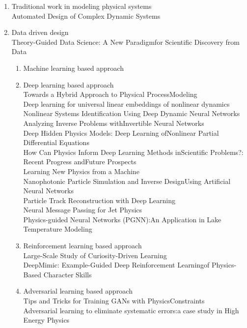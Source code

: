 \documentclass[conference]{IEEEtran}
\begin{document}
\begin{enumerate}
  \item Traditional work in modeling physical systems \\
  Automated Design of Complex Dynamic Systems \cite{hermans2014automated} \\

  \item Data driven design \\
  Theory-Guided Data Science: A New Paradigmfor Scientific Discovery from Data \cite{karpatne2017theory-guided}\\
  \begin{enumerate}
    \item Machine learning based approach \\
    \item Deep learning based approach \\
      Towards a Hybrid Approach to Physical ProcessModeling \\
      Deep learning for universal linear embeddings of nonlinear dynamics \cite{lusch2017deep} \\
      Nonlinear Systems Identification Using Deep Dynamic Neural Networks \cite{ogunmolu2016nonlinear}\\
      Analyzing Inverse Problems withInvertible Neural Networks \cite{ardizzone2018analyzing}\\
      Deep Hidden Physics Models:  Deep Learning ofNonlinear Partial Differential Equations \cite{raissi2018deep} \\
      How Can Physics Inform Deep Learning Methods inScientific Problems?: Recent Progress andFuture Prospects \\
      Learning New Physics from a Machine \cite{d'agnolo2018learning}\\
      Nanophotonic Particle Simulation and Inverse DesignUsing Artificial Neural Networks \\
      Particle Track Reconstruction with Deep Learning \\
      Neural Message Passing for Jet Physics \\
      Physics-guided Neural Networks (PGNN):An Application in Lake Temperature Modeling \cite{karpatne2017physics-guided} \\
    \item Reinforcement learning based approach \\
      Large-Scale Study of Curiosity-Driven Learning \cite{burda2018large-scale}\\
      DeepMimic: Example-Guided Deep Reinforcement Learningof Physics-Based Character Skills \cite{peng2018deepmimic} \\
    \item Adversarial learning based approach \\
      Tips and Tricks for Training GANs with PhysicsConstraints \\
      Adversarial learning to eliminate systematic errors:a case study in High Energy Physics \\
  \end{enumerate}

\end{enumerate}
\end{document}
